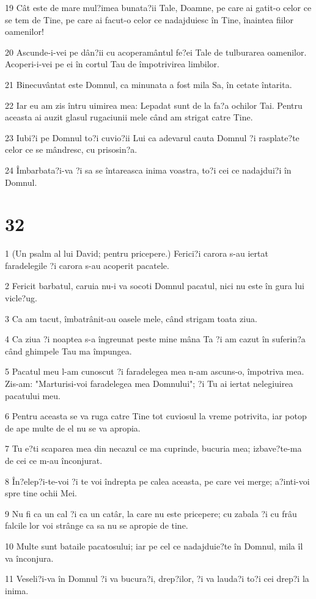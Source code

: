 \par 19 Cât este de mare mul?imea bunata?ii Tale, Doamne, pe care ai gatit-o celor ce se tem de Tine, pe care ai facut-o celor ce nadajduiesc în Tine, înaintea fiilor oamenilor!
\par 20 Ascunde-i-vei pe dân?ii cu acoperamântul fe?ei Tale de tulburarea oamenilor. Acoperi-i-vei pe ei în cortul Tau de împotrivirea limbilor.
\par 21 Binecuvântat este Domnul, ca minunata a fost mila Sa, în cetate întarita.
\par 22 Iar eu am zis întru uimirea mea: Lepadat sunt de la fa?a ochilor Tai. Pentru aceasta ai auzit glasul rugaciunii mele când am strigat catre Tine.
\par 23 Iubi?i pe Domnul to?i cuvio?ii Lui ca adevarul cauta Domnul ?i rasplate?te celor ce se mândresc, cu prisosin?a.
\par 24 Îmbarbata?i-va ?i sa se întareasca inima voastra, to?i cei ce nadajdui?i în Domnul.

\chapter{32}

\par 1 (Un psalm al lui David; pentru pricepere.) Ferici?i carora s-au iertat faradelegile ?i carora s-au acoperit pacatele.
\par 2 Fericit barbatul, caruia nu-i va socoti Domnul pacatul, nici nu este în gura lui vicle?ug.
\par 3 Ca am tacut, îmbatrânit-au oasele mele, când strigam toata ziua.
\par 4 Ca ziua ?i noaptea s-a îngreunat peste mine mâna Ta ?i am cazut în suferin?a când ghimpele Tau ma împungea.
\par 5 Pacatul meu l-am cunoscut ?i faradelegea mea n-am ascuns-o, împotriva mea. Zis-am: "Marturisi-voi faradelegea mea Domnului"; ?i Tu ai iertat nelegiuirea pacatului meu.
\par 6 Pentru aceasta se va ruga catre Tine tot cuviosul la vreme potrivita, iar potop de ape multe de el nu se va apropia.
\par 7 Tu e?ti scaparea mea din necazul ce ma cuprinde, bucuria mea; izbave?te-ma de cei ce m-au înconjurat.
\par 8 În?elep?i-te-voi ?i te voi îndrepta pe calea aceasta, pe care vei merge; a?inti-voi spre tine ochii Mei.
\par 9 Nu fi ca un cal ?i ca un catâr, la care nu este pricepere; cu zabala ?i cu frâu falcile lor voi strânge ca sa nu se apropie de tine.
\par 10 Multe sunt bataile pacatosului; iar pe cel ce nadajduie?te în Domnul, mila îl va înconjura.
\par 11 Veseli?i-va în Domnul ?i va bucura?i, drep?ilor, ?i va lauda?i to?i cei drep?i la inima.


